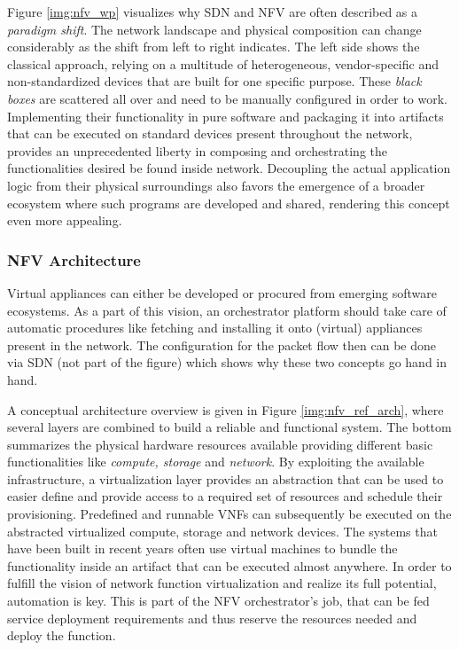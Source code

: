 Figure \ref{img:nfv_wp} visualizes why SDN and NFV are often described as a \textit{paradigm shift}. The network landscape and physical composition can change considerably as the shift from left to right indicates. The left side shows the classical approach, relying on a multitude of heterogeneous, vendor-specific and non-standardized devices that are built for one specific purpose. These \textit{black boxes} are scattered all over and need to be manually configured in order to work. Implementing their functionality in pure software and packaging it into artifacts that can be executed on standard devices present throughout the network, provides an unprecedented liberty in composing and orchestrating the functionalities desired be found inside  network. Decoupling the actual application logic from their physical surroundings also favors the emergence of a broader ecosystem where such programs are developed and shared, rendering this concept even more appealing.

\subsubsection{NFV Architecture}
Virtual appliances can either be developed or procured from emerging software ecosystems. As a part of this vision, an orchestrator platform should take care of automatic procedures like fetching and installing it onto (virtual) appliances present in the network. The configuration for the packet flow then can be done via SDN (not part of the figure) which shows why these two concepts go hand in hand. 

A conceptual architecture overview is given in Figure \ref{img:nfv_ref_arch}, where several layers are combined to build a reliable and functional system. The bottom summarizes the physical hardware resources available providing different basic functionalities like \textit{compute, storage} and \textit{network}.  By exploiting the available infrastructure, a virtualization layer provides an abstraction that can be used to easier define and provide access to a required set of resources and schedule their provisioning. Predefined and runnable VNFs can subsequently be executed on the abstracted virtualized compute, storage and network devices. The systems that have been built in recent years often use virtual machines to bundle the functionality inside an artifact that can be executed almost anywhere. In order to fulfill the vision of network function virtualization and realize its full potential, automation is key. This is part of the NFV orchestrator's job, that can be fed service deployment requirements and thus reserve the resources needed and deploy the function.

